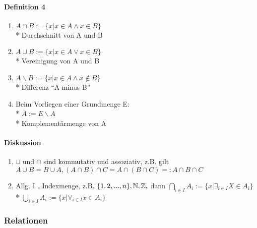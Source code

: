 \documentclass[a4paper]{scrartcl}
\begin{document}
\paragraph{Definition 4}
\begin{enumerate}
\item $A \cap B :=\{x \vert x \in A \wedge x \in B\}$\\*
Durchschnitt von A und B
\item $A \cup B :=\{ x \vert x \in A \vee x \in B\}$\\*
Vereinigung von A und B
\item $A \backslash B := \{x \vert x \in A \wedge x \notin B\}$\\*
Differenz "`A minus B"'
\item Beim Vorliegen einer Grundmenge E: \\*
$\overline{A} := E \backslash A$\\*
Komplementärmenge von A
\end{enumerate}
\paragraph{Diskussion}
\begin{enumerate}
\item $\cup$ und $\cap$ sind kommutativ und assoziativ, z.B. gilt $A\cup B = B \cup A, (A\cap B)\cap C = A\cap (B\cap C)=: A \cap B \cap C$
\item Allg. I \dots Indexmenge, z.B. $\{1,2,...,n\}, \mathbb{N},\mathbb{Z}, \\*
$ dann $\bigcap\limits_{i \in I} A_i := \{ x \vert \exists_{i\in I} X \in A_i\} $\\*
$\bigcup\limits_{i \in I} A_i := \{ x \vert \forall_{i \in I} x \in A_i\}$
\end{enumerate}


\subsubsection{Relationen}
\end{document}
